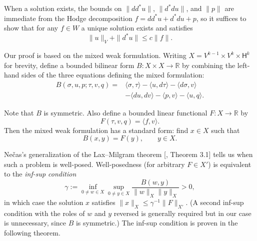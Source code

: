 \begin{Proof}
{When a solution exists, the bounds on $\|dd^*u\|$, $\|d^*du\|$, and $\|p\|$ are immediate from the Hodge decomposition $f=dd^*u+d^*du+p$, so it suffices to show that for any $f\in W$ a unique solution exists and satisfies}
\[
\|u\|_V+\|d^*u\|\leq c\|f\|.
\]

{Our proof is based on the mixed weak formulation. Writing $X=V^{k-1}\times V^k\times\mathsf H^k$ for brevity, define a bounded bilinear form $B:X\times X\to\mathbb R$ by combining the left-hand sides of the three equations defining the mixed formulation:}
\begin{equation}\label{eq:hodge-mixed-bilinear-form}
\begin{aligned}
B(\sigma,u,p;\tau,v,q)={}&\langle\sigma,\tau\rangle-\langle u,d\tau\rangle-\langle d\sigma,v\rangle\\
&-\langle du,dv\rangle-\langle p,v\rangle-\langle u,q\rangle.
\end{aligned}
\end{equation}

{Note that $B$ is symmetric. Also define a bounded linear functional $F:X\to\mathbb R$ by}
\begin{equation}\label{eq:hodge-mixed-load-functional}
F(\tau,v,q)=\langle f,v\rangle.
\end{equation}
{Then the mixed weak formulation has a standard form: find $x\in X$ such that}
\begin{equation}\label{eq:hodge-mixed-abstract-problem}
B(x,y)=F(y),\qquad y\in X.
\end{equation}

{Nečas's generalization of the Lax–Milgram theorem [, Theorem 3.1] tells us when such a problem is well-posed. Well-posedness (for arbitrary $F\in X'$) is equivalent to the \emph{inf-sup condition}}
\begin{equation}\label{eq:hodge-inf-sup-condition}
\gamma:=\inf_{0\ne w\in X}\sup_{0\ne y\in X}\frac{B(w,y)}{\|w\|_X\|y\|_X}>0,
\end{equation}
{in which case the solution $x$ satisfies $\|x\|_X\leq\gamma^{-1}\|F\|_{X'}$. (A second inf-sup condition with the roles of $w$ and $y$ reversed is generally required but in our case is unnecessary, since $B$ is symmetric.) The inf-sup condition is proven in the following theorem.}
\end{Proof}

